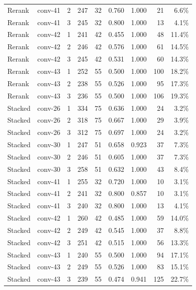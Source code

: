 {\begin{longtable}{@{}l l r r r r r r r@{}}
Rerank & conv-41 & 2 & 247 & 32 & 0.760 & 1.000 & 21 & 6.6\% \\
Rerank & conv-41 & 3 & 245 & 32 & 0.800 & 1.000 & 13 & 4.1\% \\
Rerank & conv-42 & 1 & 241 & 42 & 0.455 & 1.000 & 48 & 11.4\% \\
Rerank & conv-42 & 2 & 246 & 42 & 0.576 & 1.000 & 61 & 14.5\% \\
Rerank & conv-42 & 3 & 245 & 42 & 0.531 & 1.000 & 60 & 14.3\% \\
Rerank & conv-43 & 1 & 252 & 55 & 0.500 & 1.000 & 100 & 18.2\% \\
Rerank & conv-43 & 2 & 238 & 55 & 0.526 & 1.000 & 95 & 17.3\% \\
Rerank & conv-43 & 3 & 236 & 55 & 0.500 & 1.000 & 106 & 19.3\% \\
\midrule
Stacked & conv-26 & 1 & 334 & 75 & 0.636 & 1.000 & 24 & 3.2\% \\
Stacked & conv-26 & 2 & 318 & 75 & 0.667 & 1.000 & 29 & 3.9\% \\
Stacked & conv-26 & 3 & 312 & 75 & 0.697 & 1.000 & 24 & 3.2\% \\
Stacked & conv-30 & 1 & 247 & 51 & 0.658 & 0.923 & 37 & 7.3\% \\
Stacked & conv-30 & 2 & 246 & 51 & 0.605 & 1.000 & 37 & 7.3\% \\
Stacked & conv-30 & 3 & 258 & 51 & 0.632 & 1.000 & 43 & 8.4\% \\
Stacked & conv-41 & 1 & 255 & 32 & 0.720 & 1.000 & 10 & 3.1\% \\
Stacked & conv-41 & 2 & 241 & 32 & 0.800 & 0.857 & 10 & 3.1\% \\
Stacked & conv-41 & 3 & 240 & 32 & 0.800 & 1.000 & 13 & 4.1\% \\
Stacked & conv-42 & 1 & 260 & 42 & 0.485 & 1.000 & 59 & 14.0\% \\
Stacked & conv-42 & 2 & 249 & 42 & 0.545 & 1.000 & 37 & 8.8\% \\
Stacked & conv-42 & 3 & 251 & 42 & 0.515 & 1.000 & 56 & 13.3\% \\
Stacked & conv-43 & 1 & 240 & 55 & 0.500 & 1.000 & 94 & 17.1\% \\
Stacked & conv-43 & 2 & 249 & 55 & 0.526 & 1.000 & 83 & 15.1\% \\
Stacked & conv-43 & 3 & 239 & 55 & 0.474 & 0.941 & 125 & 22.7\% \\
\end{longtable}
}
